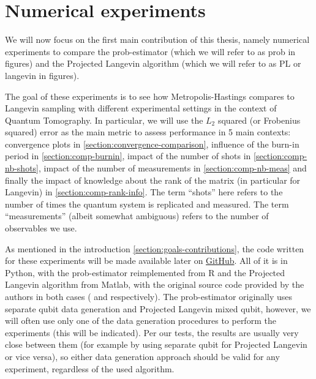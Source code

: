 \documentclass[12pt]{memoir}
\begin{document}
\chapter{Numerical experiments}\label{section:numerical-exp}
We will now focus on the first main contribution of this thesis, namely numerical experiments to compare the prob-estimator (which we will refer to as prob in figures) and the Projected Langevin algorithm (which we will refer to as PL or langevin in figures).\medbreak

The goal of these experiments is to see how  Metropolis-Hastings compares to Langevin sampling with different experimental settings in the context of Quantum Tomography. In particular, we will use the $L_2$ squared (or Frobenius squared) error as the main metric to assess performance in 5 main contexts: convergence plots in \ref{section:convergence-comparison}, influence of the burn-in period in \ref{section:comp-burnin}, impact of the number of shots in \ref{section:comp-nb-shots}, impact of the number of measurements in \ref{section:comp-nb-meas} and finally the impact of knowledge about the rank of the matrix (in particular for Langevin) in \ref{section:comp-rank-info}. The term ``shots'' here refers to the number of times the quantum system is replicated and measured. The term ``measurements'' (albeit somewhat ambiguous) refers to the number of observables we use. \medbreak

As mentioned in the introduction \ref{section:goals-contributions}, the code written for these experiments will be made available later on \href{https://github.com/daqwes/thesis}{GitHub}. All of it is in Python, with the prob-estimator reimplemented from R and the Projected Langevin algorithm from Matlab, with the original source code provided by the authors in both cases (\cite{MA17} and \cite{meth:bayesian:Langevin:ACMT2024} respectively). The prob-estimator originally uses separate qubit data generation and Projected Langevin mixed qubit, however, we will often use only one of the data generation procedures to perform the experiments (this will be indicated). Per our tests, the results are usually very close between them (for example by using separate qubit for Projected Langevin or vice versa), so either data generation approach should be valid for any experiment, regardless of the used algorithm.\medbreak
\end{document}

